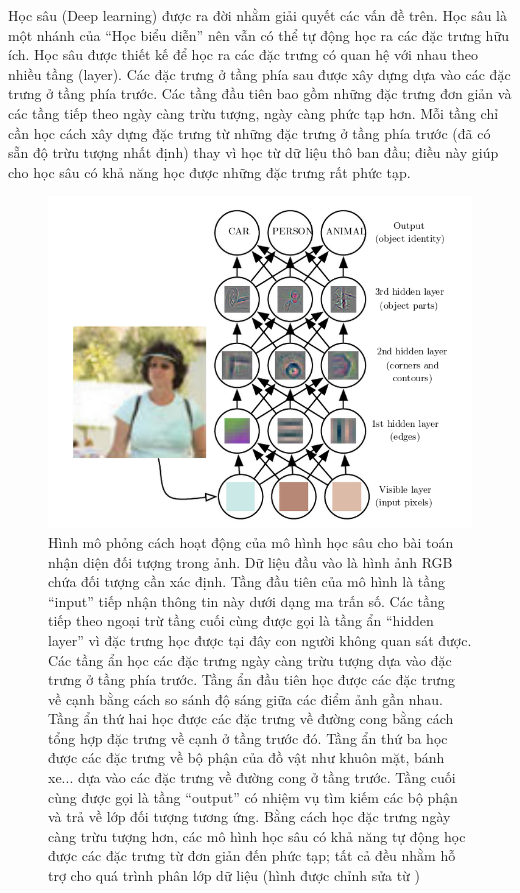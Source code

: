 	Học sâu (Deep learning) được ra đời nhằm giải quyết các vấn đề trên.
	Học sâu là một nhánh của ``Học biểu diễn'' nên vẫn có thể tự động học ra các đặc trưng hữu ích.
	Học sâu được thiết kế để học ra các đặc trưng có quan hệ với nhau theo nhiều tầng (layer).
	Các đặc trưng ở tầng phía sau được xây dựng dựa vào các đặc trưng ở tầng phía trước.
	Các tầng đầu tiên bao gồm những đặc trưng đơn giản và các tầng tiếp theo ngày càng trừu tượng, ngày càng phức tạp hơn.
	Mỗi tầng chỉ cần học cách xây dựng đặc trưng từ những đặc trưng ở tầng phía trước (đã có sẵn độ trừu tượng nhất định) thay vì học từ dữ liệu thô ban đầu; điều này giúp cho học sâu có khả năng học được những đặc trưng rất phức tạp.
	
	\begin{figure}
		\centering
		\includegraphics[width=\textwidth]{deep_learning_example}
		\caption{Hình mô phỏng cách hoạt động của mô hình học sâu cho bài toán nhận diện đối tượng trong ảnh.
		Dữ liệu đầu vào là hình ảnh RGB chứa đối tượng cần xác định. Tầng đầu tiên của mô hình là tầng ``input'' tiếp nhận thông tin này dưới dạng ma trấn số. 
		Các tầng tiếp theo ngoại trừ tầng cuối cùng được gọi là tầng ẩn ``hidden layer'' vì đặc trưng học được tại đây con người không quan sát được. 
		Các tầng ẩn học các đặc trưng ngày càng trừu tượng dựa vào đặc trưng ở tầng phía trước. 
		Tầng ẩn đầu tiên học được các đặc trưng về cạnh bằng cách so sánh độ sáng giữa các điểm ảnh gần nhau. 
		Tầng ẩn thứ hai học được các đặc trưng về đường cong bằng cách tổng hợp đặc trưng về cạnh ở tầng trước đó. 
		Tầng ẩn thứ ba học được các đặc trưng về bộ phận của đồ vật như khuôn mặt, bánh xe... dựa vào các đặc trưng về đường cong ở tầng trước. 
		Tầng cuối cùng được gọi là tầng ``output'' có nhiệm vụ tìm kiếm các bộ phận và trả về lớp đối tượng tương ứng. 
		Bằng cách học đặc trưng ngày càng trừu tượng hơn, các mô hình học sâu có khả năng tự động học được các đặc trưng từ đơn giản đến phức tạp; tất cả đều nhằm hỗ trợ cho quá trình phân lớp dữ liệu (hình được chỉnh sửa từ \cite{Goodfellow-et-al-2016-Book})}
		\label{dlex}
	\end{figure}
	
